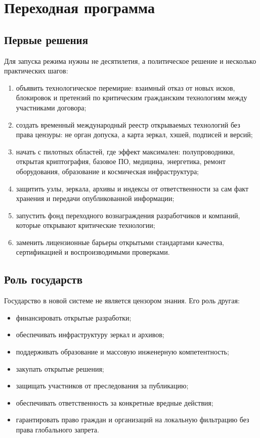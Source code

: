 \documentclass[11pt,a4paper]{article}
\begin{document}
\section{Переходная программа}

\subsection{Первые решения}

Для запуска режима нужны не десятилетия, а политическое решение и несколько практических шагов:

\begin{enumerate}
  \item объявить технологическое перемирие: взаимный отказ от новых исков, блокировок и претензий по критическим гражданским технологиям между участниками договора;
  \item создать временный международный реестр открываемых технологий без права цензуры: не орган допуска, а карта зеркал, хэшей, подписей и версий;
  \item начать с пилотных областей, где эффект максимален: полупроводники, открытая криптография, базовое ПО, медицина, энергетика, ремонт оборудования, образование и космическая инфраструктура;
  \item защитить узлы, зеркала, архивы и индексы от ответственности за сам факт хранения и передачи опубликованной информации;
  \item запустить фонд переходного вознаграждения разработчиков и компаний, которые открывают критические технологии;
  \item заменить лицензионные барьеры открытыми стандартами качества, сертификацией и воспроизводимыми проверками.
\end{enumerate}

\subsection{Роль государств}

Государство в новой системе не является цензором знания. Его роль другая:

\begin{itemize}
  \item финансировать открытые разработки;
  \item обеспечивать инфраструктуру зеркал и архивов;
  \item поддерживать образование и массовую инженерную компетентность;
  \item закупать открытые решения;
  \item защищать участников от преследования за публикацию;
  \item обеспечивать ответственность за конкретные вредные действия;
  \item гарантировать право граждан и организаций на локальную фильтрацию без права глобального запрета.
\end{itemize}
\end{document}
